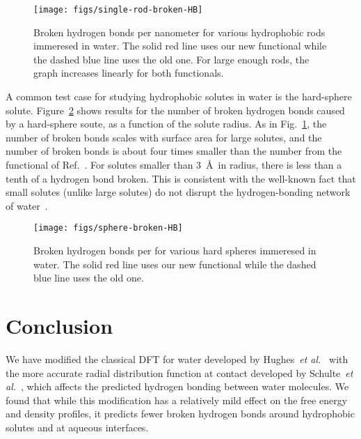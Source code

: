\documentclass[twocolumn,amsmath,amssymb,prl]{revtex4-1}
\begin{document}
\begin{figure}
\begin{center}
\texttt{[image: figs/single-rod-broken-HB]}
\end{center}
\caption{Broken hydrogen bonds per nanometer for various hydrophobic rods
  immeresed in water.  The solid red line uses our new functional
  while the dashed blue line uses the old one. For large enough rods,
  the graph increases linearly for both functionals.}
\label{fig:single-rod-broken-HB}
\end{figure}

A common test case for studying hydrophobic solutes in water is the
hard-sphere solute.  Figure~\ref{fig:spheres-broken-HB} shows results
for the number of broken hydrogen bonds caused by a hard-sphere soute,
as a function of the solute radius.  As in
Fig.~\ref{fig:single-rod-broken-HB}, the number of broken bonds scales
with surface area for large solutes, and the number of broken bonds is
about four times smaller than the number from the functional of
Ref.~.  For solutes smaller than
3~\AA\ in radius, there is less than a tenth of a hydrogen bond
broken. This is consistent with the well-known fact that small solutes
(unlike large solutes) do not disrupt the hydrogen-bonding network of
water~\cite{chandler2005}.

\begin{figure}
\begin{center}
\texttt{[image: figs/sphere-broken-HB]}
\end{center}
\caption{Broken hydrogen bonds per for various hard spheres
  immeresed in water.  The solid red line uses our new functional
  while the dashed blue line uses the old one.}
\label{fig:spheres-broken-HB}
\end{figure}

\section{Conclusion}

We have modified the classical DFT for water developed by
Hughes~\emph{et al.}~\cite{hughes2013classical} with the more accurate
radial distribution function at contact developed by Schulte~\emph{et
  al.}~\cite{schulte2012using}, which affects the predicted hydrogen
bonding between water molecules.  We found that while this
modification has a relatively mild effect on the free energy and
density profiles, it predicts fewer broken hydrogen bonds around
hydrophobic solutes and at aqueous interfaces.
\end{document}
